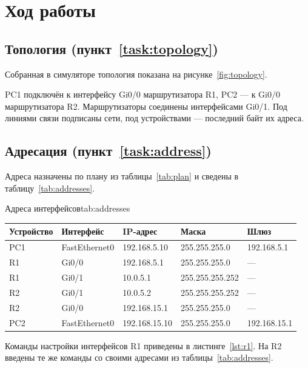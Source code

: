 \section{Ход работы}

\subsection{Топология (пункт~\ref{task:topology})}
Собранная в симуляторе топология показана на рисунке~\ref{fig:topology}.


PC1 подключён к интерфейсу Gi0/0 маршрутизатора R1, PC2 — к Gi0/0 маршрутизатора R2.
Маршрутизаторы соединены интерфейсами Gi0/1. Под линиями связи подписаны сети, под
устройствами — последний байт их адреса.

\subsection{Адресация (пункт~\ref{task:address})}
Адреса назначены по плану из таблицы~\ref{tab:plan} и сведены в таблицу~\ref{tab:addresses}.

\begin{bbttable}{Адреса интерфейсов}{tab:addresses}
  \begin{tabular}{|l|l|l|l|l|}
    \hline
    Устройство & Интерфейс & IP-адрес & Маска & Шлюз \\ \hline
    PC1 & FastEthernet0 & 192.168.5.10 & 255.255.255.0 & 192.168.5.1 \\ \hline
    R1 & Gi0/0 & 192.168.5.1 & 255.255.255.0 & — \\ \hline
    R1 & Gi0/1 & 10.0.5.1 & 255.255.255.252 & — \\ \hline
    R2 & Gi0/1 & 10.0.5.2 & 255.255.255.252 & — \\ \hline
    R2 & Gi0/0 & 192.168.15.1 & 255.255.255.0 & — \\ \hline
    PC2 & FastEthernet0 & 192.168.15.10 & 255.255.255.0 & 192.168.15.1 \\ \hline
  \end{tabular}
\end{bbttable}

Команды настройки интерфейсов R1 приведены в листинге~\ref{lst:r1}. На R2 введены те же
команды со своими адресами из таблицы~\ref{tab:addresses}.


